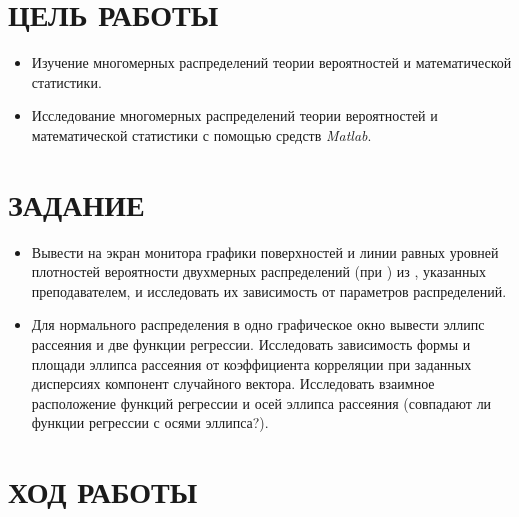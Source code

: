 \documentclass[a4paper,hidelinks,14pt]{extarticle}
\begin{document}

\section{ЦЕЛЬ РАБОТЫ}

\begin{itemize}
	\item Изучение многомерных распределений теории вероятностей и математической статистики.
	\item Исследование многомерных распределений теории вероятностей и математической статистики с помощью средств \textit{Matlab}.
\end{itemize}

\section{ЗАДАНИЕ}
\begin{itemize}
\item Вывести на экран монитора графики поверхностей и линии равных уровней плотностей вероятности двухмерных распределений (при ) из , указанных преподавателем, и исследовать их зависимость от параметров распределений.

\item Для нормального распределения в одно графическое окно вывести эллипс рассеяния и две функции регрессии. Исследовать зависимость формы и площади эллипса рассеяния от коэффициента корреляции при заданных дисперсиях компонент случайного вектора. Исследовать взаимное расположение функций регрессии и осей эллипса рассеяния (совпадают ли функции регрессии с осями эллипса?).
\end{itemize}

\newpage

\section{ХОД РАБОТЫ}
\end{document}

